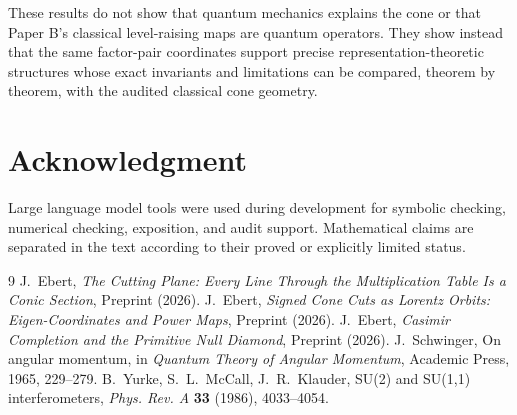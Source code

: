 \documentclass[11pt]{amsart}
\theoremstyle{remark}
\begin{document}
These results do not show that quantum mechanics explains the cone or that Paper B's classical level-raising maps are quantum operators.  They show instead that the same factor-pair coordinates support precise representation-theoretic structures whose exact invariants and limitations can be compared, theorem by theorem, with the audited classical cone geometry.

\section*{Acknowledgment}
Large language model tools were used during development for symbolic checking, numerical checking, exposition, and audit support.  Mathematical claims are separated in the text according to their proved or explicitly limited status.

\begin{thebibliography}{9}
 J.~Ebert, \emph{The Cutting Plane: Every Line Through the Multiplication Table Is a Conic Section}, Preprint (2026).
 J.~Ebert, \emph{Signed Cone Cuts as Lorentz Orbits: Eigen-Coordinates and Power Maps}, Preprint (2026).
 J.~Ebert, \emph{Casimir Completion and the Primitive Null Diamond}, Preprint (2026).
 J.~Schwinger, On angular momentum, in \emph{Quantum Theory of Angular Momentum}, Academic Press, 1965, 229--279.
 B.~Yurke, S.~L.~McCall, J.~R.~Klauder, SU(2) and SU(1,1) interferometers, \emph{Phys. Rev. A} \textbf{33} (1986), 4033--4054.
\end{thebibliography}
\end{document}
